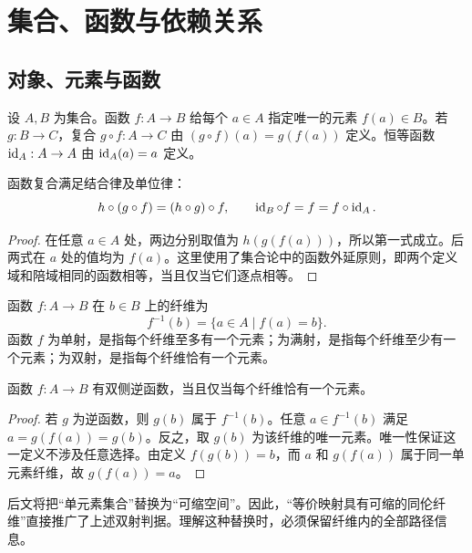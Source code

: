 \chapter{集合、函数与依赖关系}
\section{对象、元素与函数}
\begin{definition}[函数及其复合]
设 $A,B$ 为集合。函数 $f:A\to B$ 给每个 $a\in A$ 指定唯一的元素 $f(a)\in B$。若 $g:B\to C$，复合 $g\circ f:A\to C$ 由 $(g\circ f)(a)=g(f(a))$ 定义。恒等函数 $\operatorname{id}_A:A\to A$ 由 $\operatorname{id}_A(a)=a$ 定义。
\end{definition}
\begin{proposition}
函数复合满足结合律及单位律：
\[
h\circ(g\circ f)=(h\circ g)\circ f,
\qquad \operatorname{id}_B\circ f=f=f\circ\operatorname{id}_A.
\]
\end{proposition}
\begin{proof}
在任意 $a\in A$ 处，两边分别取值为 $h(g(f(a)))$，所以第一式成立。后两式在 $a$ 处的值均为 $f(a)$。这里使用了集合论中的函数外延原则，即两个定义域和陪域相同的函数相等，当且仅当它们逐点相等。
\end{proof}
\begin{definition}[纤维]
函数 $f:A\to B$ 在 $b\in B$ 上的纤维为
\[
f^{-1}(b)=\{a\in A\mid f(a)=b\}.
\]
函数 $f$ 为单射，是指每个纤维至多有一个元素；为满射，是指每个纤维至少有一个元素；为双射，是指每个纤维恰有一个元素。
\end{definition}
\begin{lemma}[双射的纤维判据]
函数 $f:A\to B$ 有双侧逆函数，当且仅当每个纤维恰有一个元素。
\end{lemma}
\begin{proof}
若 $g$ 为逆函数，则 $g(b)$ 属于 $f^{-1}(b)$。任意 $a\in f^{-1}(b)$ 满足 $a=g(f(a))=g(b)$。反之，取 $g(b)$ 为该纤维的唯一元素。唯一性保证这一定义不涉及任意选择。由定义 $f(g(b))=b$，而 $a$ 和 $g(f(a))$ 属于同一单元素纤维，故 $g(f(a))=a$。
\end{proof}
\begin{remark}
后文将把“单元素集合”替换为“可缩空间”。因此，“等价映射具有可缩的同伦纤维”直接推广了上述双射判据。理解这种替换时，必须保留纤维内的全部路径信息。
\end{remark}

